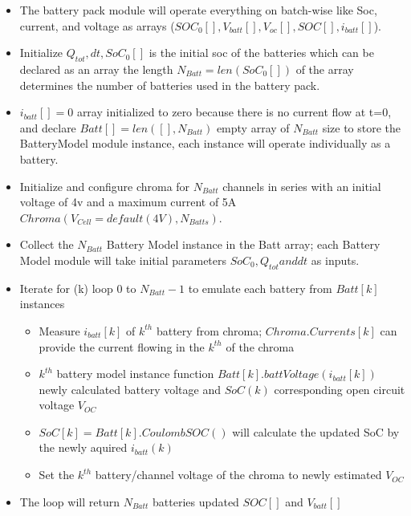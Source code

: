 \begin{itemize}
    \item The battery pack module will operate everything on batch-wise like Soc, current, and voltage as arrays ($SOC_0[] ,V_{batt}[],V_{oc}[],SOC[],i_{batt}[]$).
    \item Initialize $Q_{tot},dt , SoC_0[]$ is the initial soc of the batteries which can be declared as an array the length $N_{Batt} = len(SoC_0[])$ of the array determines the number of batteries used in the battery pack.
    \item $i_{batt}[] = 0$ array initialized to zero because there is no current flow at t=0, and declare  $Batt[] = len([],N_{Batt})$ empty array of $N_{Batt}$ size to store the BatteryModel module instance, each instance will operate individually as a battery.
    \item Initialize and configure chroma for $N_{Batt}$ channels in series with an initial voltage of 4v and a maximum current of 5A  $Chroma(V_{Cell}=default (4V),N_{Batts} )$.
    \item Collect the $N_{Batt}$ Battery Model instance in the Batt array;  each  Battery Model module will take initial parameters $SoC_0, Q_{tot} and dt$ as inputs.
    \item Iterate for (k) loop 0 to $N_{Batt} -1$ to emulate each battery from $Batt[k]$ instances
        \begin{itemize}
            \item Measure $i_{batt}[k]$ of $k^{th}$ battery from chroma; $Chroma.Currents[k]$ can provide the current flowing in the $k^{th}$ of the chroma
            \item $k^{th}$ battery model instance function $Batt[k].battVoltage(i_{batt}[k])$ newly calculated battery voltage and $SoC(k)$ corresponding open circuit voltage $V_{OC}$
            \item $SoC[k] = Batt[k].CoulombSOC()$ will calculate the updated SoC by the newly aquired $i_{batt}(k)$
            \item Set the $k^{th}$ battery/channel voltage of the chroma to newly estimated $V_{OC}$
        \end{itemize}
    \item The loop will return  $N_{Batt}$ batteries updated $SOC[]$ and $V_{batt}[]$
\end{itemize}

